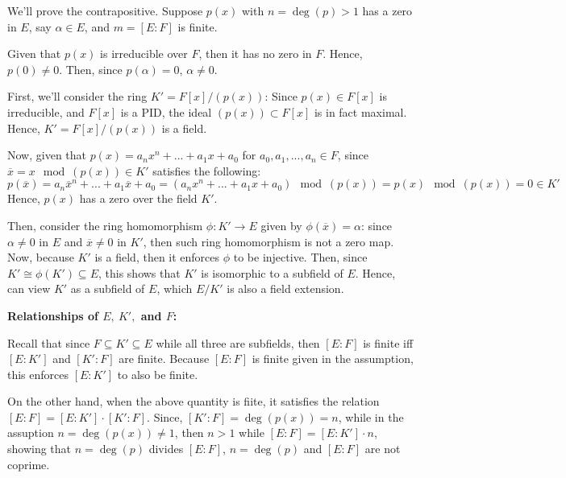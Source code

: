 \documentclass{article}
\begin{document}
We'll prove the contrapositive. 
Suppose $p(x)$ with $n=\deg(p)>1$ has a zero in $E$, say $\alpha\in E$, and $m=[E:F]$ is finite. 

Given that $p(x)$ is irreducible over $F$, then it has no zero in $F$. Hence, $p(0)\neq 0$. Then, since $p(\alpha)=0$, $\alpha\neq 0$.

\hfil

First, we'll consider the ring $K'=F[x]/(p(x))$: Since $p(x)\in F[x]$ is irreducible, and $F[x]$ is a PID,
the ideal $(p(x))\subset F[x]$ is in fact maximal. Hence, $K'=F[x]/(p(x))$ is a field.

Now, given that $p(x)=a_nx^n+...+a_1x+a_0$ for $a_0,a_1,...,a_n\in F$, since $\overline{x} = x\mod (p(x))\in K'$ satisfies the following:
$$p(\overline{x})=a_n\overline{x}^n+...+a_1\overline{x}+a_0 = (a_nx^n+...+a_1x+a_0)\mod (p(x))=p(x)\mod (p(x))=0\in K'$$
Hence, $p(x)$ has a zero over the field $K'$.

\hfil

Then, consider the ring homomorphism $\phi:K'\rightarrow E$ given by $\phi(\overline{x})=\alpha$: since $\alpha\neq 0$ in $E$ and $\overline{x}\neq 0$ in $K'$,
then such ring homomorphism is not a zero map. Now, because $K'$ is a field, then it enforces $\phi$ to be injective.
Then, since $K'\cong \phi(K')\subseteq E$, this shows that $K'$ is isomorphic to a subfield of $E$. Hence, can view $K'$ as a subfield of $E$, which $E/K'$ is also a field extension.

\hfil

\textbf{Relationships of $E,\ K',$ and $F$:}

Recall that since $F\subseteq K'\subseteq E$ while all three are subfields, then $[E:F]$ is finite iff $[E:K']$ and $[K':F]$ are finite.
Because $[E:F]$ is finite given in the assumption, this enforces $[E:K']$ to also be finite.

On the other hand, when the above quantity is fiite, it satisfies the relation $[E:F]=[E:K']\cdot [K':F]$.
Since, $[K':F]=\deg(p(x))=n$, while in the assuption $n=\deg(p(x))\neq 1$, then $n>1$ while $[E:F]=[E:K']\cdot n$, showing that $n=\deg(p)$ divides $[E:F]$, $n=\deg(p)$ and $[E:F]$ are not coprime.

\hfil
\end{document}
